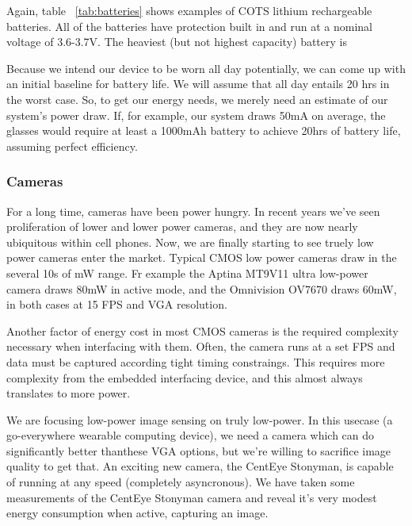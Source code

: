 Again, table ~\ref{tab:batteries} shows examples of COTS lithium rechargeable batteries.  All of the batteries have protection built in and run at a nominal voltage of 3.6-3.7V.  The heaviest (but not highest capacity) battery is 

Because we intend our device to be worn all day potentially, we can come up with an initial baseline for battery life.  We will assume that all day entails 20 hrs in the worst case.  So, to get our energy needs, we merely need an estimate of our system's power draw.  If, for example, our system draws 50mA on average, the glasses would require at least a 1000mAh battery to achieve 20hrs of battery life, assuming perfect efficiency.

\subsubsection{Cameras}

For a long time, cameras have been power hungry.  In recent years we've seen proliferation of lower and lower power cameras, and they are now nearly ubiquitous within cell phones.  Now, we are finally starting to see truely low power cameras enter the market.  Typical CMOS low power cameras draw in the several 10s of mW range.  Fr example the Aptina MT9V11 ultra low-power camera draws 80mW in active mode, and the Omnivision OV7670 draws 60mW, in both cases at 15 FPS and VGA resolution.

Another factor of energy cost in most CMOS cameras is the required complexity necessary when interfacing with them.  Often, the camera runs at a set FPS and data must be captured according tight timing constraings.  This requires more complexity from the embedded interfacing device, and this almost always translates to more power.

We are focusing low-power image sensing on truly low-power.  In this usecase (a go-everywhere wearable computing device), we need a camera which can do significantly better thanthese VGA options, but we're willing to sacrifice image quality to get that.  An exciting new camera, the CentEye Stonyman, is capable of running at any speed (completely asyncronous).  We have taken some measurements of the CentEye Stonyman camera and reveal it's very modest energy consumption when active, capturing an image.





